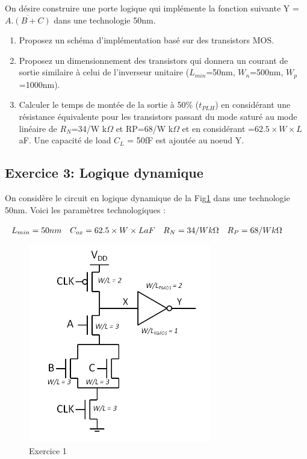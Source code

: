 \documentclass[paper=a4, fontsize=11pt]{article} %
\numberwithin{equation}{section} %
\numberwithin{figure}{section} %
\numberwithin{table}{section} %
\begin{document}
On désire construire une porte logique qui implémente la fonction suivante Y = $\overline{A.(B+C)}$ dans une technologie 50nm.
\begin{enumerate}
	\item Proposez un schéma d'implémentation basé sur des transistors MOS.
	\item Proposez un dimensionnement des transistors qui donnera un courant de sortie similaire à celui de l'inverseur unitaire ($L_{min}$=50nm, $W_{n}$=500nm, $W_{p}$=1000nm).
\item Calculer le temps de montée de la sortie à 50\% ($t_{PLH}$) en considérant une résistance équivalente pour les transistors passant du mode saturé au mode linéaire de $R_N$=34/W k$\Omega$ et RP=68/W k$\Omega$ et en considérant \cox=$62.5\times W \times L$ aF. Une capacité de load $C_L$ = 50fF est ajoutée au noeud Y.
\end{enumerate}

\subsection*{Exercice 3: Logique dynamique}
On considère le circuit en logique dynamique de la Fig\ref{fig8-3} dans une technologie 50nm. Voici les paramètres technologiques :
\begin{center} $ \begin{array}{l l l l} L_{min} = 50nm & C_{ox} = 62.5\times W \times L aF & R_N=34/W k \Omega & R_P=68/W k\Omega\\ \end{array}$\end{center}

\begin{figure}[!htbp]
   \centering
   \includegraphics[width=8cm]{figure/fig8-3.png}
   \caption{Exercice 1}
   \label{fig8-3}
\end{figure}
\end{document}
